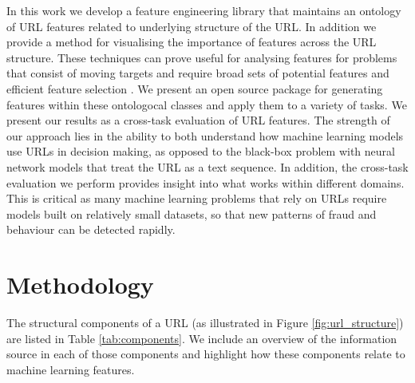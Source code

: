 \documentclass{aircc}
\begin{document}
In this work we develop a feature engineering library that maintains an ontology of 
URL features related to underlying structure of the URL. In addition we provide a 
method for visualising the importance of features across the URL structure. 
These techniques can prove useful for analysing features for problems that
consist of moving targets and require broad sets of potential features and 
efficient feature selection \cite{Basnet2012}.
We present an open source package for generating features within these
ontologocal classes and apply them to a variety of tasks. We present our results as a
cross-task evaluation of URL features. The strength of our approach lies in the 
ability to both understand how machine learning models use URLs in decision making, 
as opposed to the black-box problem with neural network
models that treat the URL as a text sequence. In addition, the cross-task evaluation 
we perform provides insight into what works within different domains. 
This is critical as many machine learning problems that rely on URLs require
models built on relatively small datasets, so that new patterns of fraud and 
behaviour can be detected rapidly.

\section{Methodology}

The structural components of a URL (as illustrated in Figure \ref{fig:url_structure}) 
are listed in Table \ref{tab:components}.
We include an overview of the information source in each of those components and 
highlight how these components relate to machine learning features.
\end{document}
